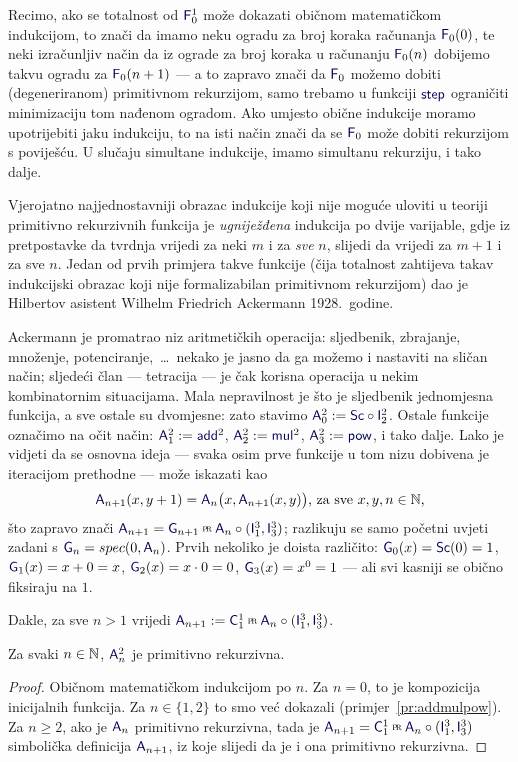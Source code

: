 Recimo, ako se totalnost od $\f F_0^1$ može dokazati običnom matematičkom indukcijom, to znači da imamo neku ogradu za broj koraka računanja $\f F_0(0)$, te neki izračunljiv način da iz ograde za broj koraka u računanju $\f F_0(n)$ dobijemo takvu ogradu za $\f F_0(n+1)$ --- a to zapravo znači da $\f F_0$ možemo dobiti (degeneriranom) primitivnom rekurzijom, samo trebamo u funkciji $\f{step}$ ograničiti minimizaciju tom nađenom ogradom. Ako umjesto obične indukcije moramo upotrijebiti jaku indukciju, to na isti način znači da se $\f F_0$ može dobiti rekurzijom s poviješću. U slučaju simultane indukcije, imamo simultanu rekurziju, i tako dalje.

Vjerojatno najjednostavniji obrazac indukcije koji nije moguće uloviti u teoriji primitivno rekurzivnih funkcija je \emph{ugniježđena} indukcija po dvije varijable, gdje iz pretpostavke da tvrdnja vrijedi za neki $m$ i za \emph{sve} $n$, slijedi da vrijedi za $m+1$ i za sve $n$. Jedan od prvih primjera takve funkcije (čija totalnost zahtijeva takav indukcijski obrazac koji nije formalizabilan primitivnom rekurzijom) dao je Hilbertov asistent Wilhelm Friedrich Ackermann 1928.\ godine.

Ackermann je promatrao niz aritmetičkih operacija: sljedbenik, zbrajanje, množenje, potenciranje,~\ldots\ nekako je jasno da ga možemo i nastaviti na sličan način; sljedeći član --- tetracija --- je čak korisna operacija u nekim kombinatornim situacijama. Mala nepravilnost je što je sljedbenik jednomjesna funkcija, a sve ostale su dvomjesne: zato stavimo $\f A_0^2:=\f{Sc}\circ \f I_2^2$. Ostale funkcije označimo na očit način: $\f A_1^2:=\f{add}^2$, $\f A_2^2:=\f{mul}^2$, $\f A_3^2:=\f{pow}$, i tako dalje. Lako je vidjeti da se osnovna ideja --- svaka osim prve funkcije u tom nizu dobivena je iteracijom prethodne --- može iskazati kao
\begin{equation}\label{eq:A2SSdef}
    \f A_{n+1}(x,y+1)=\f A_n\bigl(x,\f A_{n+1}(x,y)\bigr)\text{, za sve }x,y,n\in\N\text,
\end{equation}
što zapravo znači $\f A_{n+1}=\f G_{n+1}\pr\f A_n\circ(\f I_1^3,\f I_3^3)$; razlikuju se samo početni uvjeti zadani s $\f G_n=spec(0,\f A_n)$. Prvih nekoliko je doista različito: $\f G_0(x)=\f{Sc}(0)=1$, $\f G_1(x)=x+0=x$, $\f G_2(x)=x\cdot 0=0$, $\f G_3(x)=x^0=1$ --- ali svi kasniji se obično fiksiraju na $1$.

Dakle, za sve $n>1$ vrijedi $\f A_{n+1}:=\f C_1^1\pr\f A_n\circ(\f I_1^3,\f I_3^3)$.

\begin{propozicija}\label{pp:Anprn}
    Za svaki $n\in{\mathbb N}$, $\f A_n^2$ je primitivno rekurzivna.
\end{propozicija}
\begin{proof}
Običnom matematičkom indukcijom po $n$. Za $n=0$, to je kompozicija inicijalnih funkcija. Za $n\in\{1,2\}$ to smo već dokazali (primjer~\ref{pr:addmulpow}). Za $n\ge 2$, ako je $\f A_n$ primitivno rekurzivna, tada je $\f A_{n+1}=\f C_1^1\pr\f A_n\circ(\f I_1^3,\f I_3^3)$ simbolička definicija $\f A_{n+1}$, iz koje slijedi da je i ona primitivno rekurzivna.
\end{proof}

